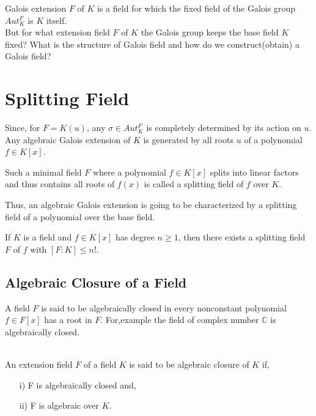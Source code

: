 Galois extension \(F\) of  \(K\) is a field for which the fixed field of the Galois group \(Aut_K^F\) is \(K\) itself.\\
But for what extension field \(F\) of \(K\) the Galois group keeps the base field \(K\) fixed? What is the structure of Galois field and how do we construct(obtain) a Galois field?


\section{Splitting Field}
Since, for \(F=K(u)\), any \(\sigma \in Aut_K^F\) is completely determined by its action on \(u\). Any algebraic Galois extension of \(K\) is generated by all roots \(u\) of a polynomial \(f \in K[x]\).

\begin{definition}
  Such a minimal field \(F\) where a polynomial \(f \in K[x]\) splits into linear factors and thus contains all roots of \(f(x)\) is called a splitting field of \(f\) over \(K\).
\end{definition}
Thus, an algebraic Galois extension is going to be characterized by a splitting field of a polynomial over the base field.\\

\begin{theorem}
  If \(K\) is a field and \(f \in K[x]\) has degree \(n \geq 1\), then there exists a splitting field \(F\) of \(f\) with \([F:K] \leq n!\).
  \end{theorem}

\subsection{Algebraic Closure of a Field}
A field \(F\) is said to be algebraically closed in every nonconstant polynomial \(f \in F[x]\) has a root in \(F\).
For,example the field of complex number \(\mathbb{C}\) is algebraically closed.\\ \\

\begin{definition}
An extension field \(F\) of a field \(K\) is said to be algebraic closure of \(K\) if,
\begin{enumerate}
\item[i)] F is algebraically closed and,
  \item[ii)] F is algebraic over \(K\).
  \end{enumerate}
\end{definition}


